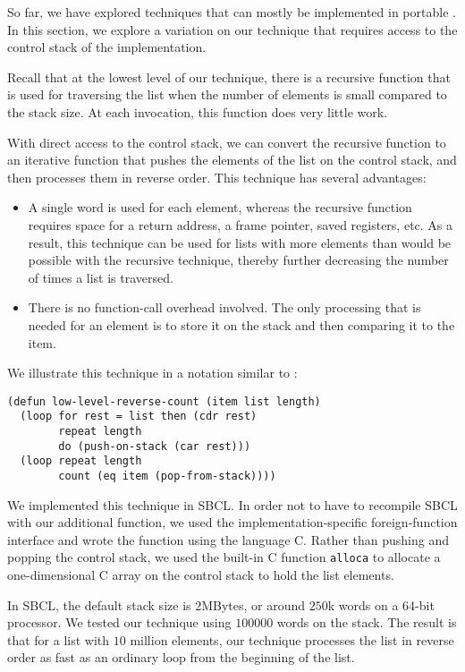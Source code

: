 So far, we have explored techniques that can mostly be implemented in
portable \commonlisp{}.  In this section, we explore a variation on
our technique that requires access to the control stack of the
implementation.

Recall that at the lowest level of our technique, there is a recursive
function that is used for traversing the list when the number of
elements is small compared to the stack size.  At each invocation,
this function does very little work.

With direct access to the control stack, we can convert the recursive
function to an iterative function that pushes the elements of the list
on the control stack, and then processes them in reverse order.  This
technique has several advantages:

\begin{itemize}
\item A single word is used for each element, whereas the recursive
  function requires space for a return address, a frame pointer,
  saved registers, etc.  As a result, this technique can be used for
  lists with more elements than would be possible with the recursive
  technique, thereby further decreasing the number of times a list is
  traversed.
\item There is no function-call overhead involved.  The only
  processing that is needed for an element is to store it on the stack
  and then comparing it to the item.
\end{itemize}

We illustrate this technique in a notation similar to \commonlisp{}:

\begin{verbatim}
(defun low-level-reverse-count (item list length)
  (loop for rest = list then (cdr rest)
        repeat length
        do (push-on-stack (car rest)))
  (loop repeat length
        count (eq item (pop-from-stack))))
\end{verbatim}

We implemented this technique in SBCL.  In order not to have to
recompile SBCL with our additional function, we used the
implementation-specific foreign-function interface and wrote the
function using the language C.  Rather than pushing and popping the
control stack, we used the built-in C function \texttt{alloca} to
allocate a one-dimensional C array on the control stack to hold the
list elements.

In SBCL, the default stack size is $2$MBytes, or around $250$k words
on a 64-bit processor.  We tested our technique using $100000$ words
on the stack.  The result is that for a list with $10$ million
elements, our technique processes the list in reverse order as fast as
an ordinary loop from the beginning of the list.

